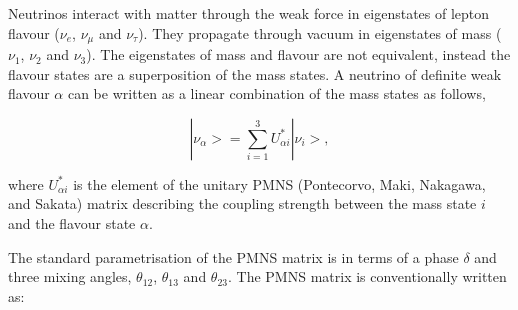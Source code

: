 Neutrinos interact with matter through the weak force in eigenstates
of lepton flavour ($\nu_e$, $\nu_{\mu}$ and $\nu_{\tau}$). They
propagate through vacuum in eigenstates of mass ($\nu_1$, $\nu_2$ and
$\nu_3$). The eigenstates of mass and flavour are not equivalent,
instead the flavour states are a superposition of the mass states.  
A neutrino of definite weak flavour $\alpha$ can be written as a
linear combination of the mass states as follows, 

\begin{equation}
|\nu_{\alpha}> = \sum_{i=1}^{3} U^{*}_{\alpha i}|\nu_i>,
\end{equation}

\noindent where $U^* _{\alpha i}$ is the element of the unitary PMNS
(Pontecorvo, Maki, Nakagawa, and Sakata) matrix describing the
coupling strength between the mass state $i$ and the flavour state
$\alpha$.  

The standard parametrisation of the PMNS matrix is in terms of a phase
$\delta$ and three mixing angles, $\theta_{12}$, $\theta_{13}$ and
$\theta_{23}$. The PMNS matrix is conventionally written as: 

